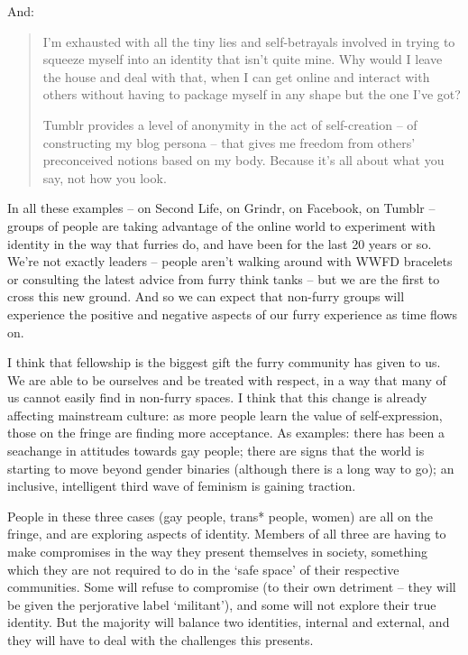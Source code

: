 And:

\begin{quotation}
  I'm exhausted with all the tiny lies and self-betrayals involved in trying to squeeze myself into an identity that isn't quite mine. Why would I leave the house and deal with that, when I can get online and interact with others without having to package myself in any shape but the one I've got?

  Tumblr provides a level of anonymity in the act of self-creation  --  of constructing my blog persona  --  that gives me freedom from others' preconceived notions based on my body. Because it's all about what you say, not how you look.
\end{quotation}

In all these examples -- on Second Life, on Grindr, on Facebook, on Tumblr -- groups of people are taking advantage of the online world to experiment with identity in the way that furries do, and have been for the last 20 years or so. We're not exactly leaders -- people aren't walking around with WWFD bracelets or consulting the latest advice from furry think tanks -- but we are the first to cross this new ground. And so we can expect that non-furry groups will experience the positive and negative aspects of our furry experience as time flows on.

I think that fellowship is the biggest gift the furry community has given to us. We are able to be ourselves and be treated with respect, in a way that many of us cannot easily find in non-furry spaces. I think that this change is already affecting mainstream culture: as more people learn the value of self-expression, those on the fringe are finding more acceptance. As examples: there has been a seachange in attitudes towards gay people; there are signs that the world is starting to move beyond gender binaries (although there is a long way to go); an inclusive, intelligent third wave of feminism is gaining traction.

People in these three cases (gay people, trans* people, women) are all on the fringe, and are exploring aspects of identity. Members of all three are having to make compromises in the way they present themselves in society, something which they are not required to do in the `safe space' of their respective communities. Some will refuse to compromise (to their own detriment -- they will be given the perjorative label `militant'), and some will not explore their true identity. But the majority will balance two identities, internal and external, and they will have to deal with the challenges this presents.

